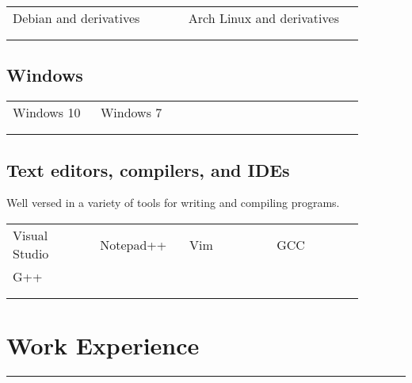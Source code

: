 \documentclass[letterpaper]{article}
\newcommand{\horizontalLine}{%
    \rule{\linewidth}{0.4pt}
    \vspace{1ex}
}
\begin{document}
        \begin{tabular}{p{0.44\linewidth} p{0.44\linewidth}}
            \\
            Debian and derivatives & Arch Linux and derivatives \\
            \\
            \\
        \end{tabular}

        \subsection*{Windows}

        \begin{tabular}{p{0.22\linewidth} p{0.22\linewidth} p{0.22\linewidth} p{0.22\linewidth}}
            \\
            Windows 10 & Windows 7 \\
            \\
            \\
        \end{tabular}

        \subsection*{Text editors, compilers, and IDEs}
        Well versed in a variety of tools for writing and compiling programs.

        \begin{tabular}{p{0.22\linewidth} p{0.22\linewidth} p{0.22\linewidth} p{0.22\linewidth}}
            \\
            Visual Studio & Notepad++ & Vim & GCC \\
            G++ \\
            \\
            \\
        \end{tabular}

    \section*{Work Experience}

        \horizontalLine
\end{document}
